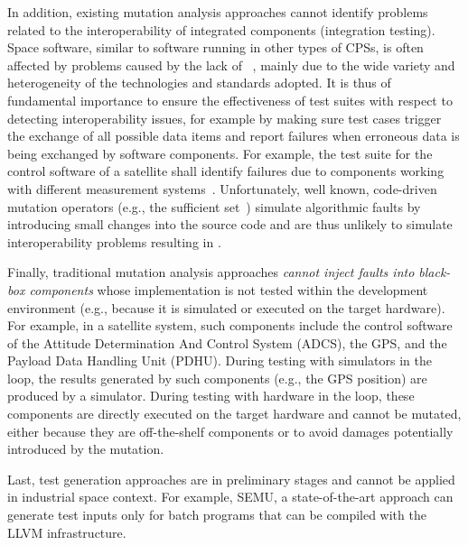 In addition, existing mutation analysis approaches cannot identify problems related to the interoperability of integrated components (integration testing).
Space software, similar to software running in other types of CPSs, is often affected by problems caused by the lack of  ~\cite{Givehchi:2017,Jirkovsk:2017}, mainly due to the wide variety and heterogeneity of the technologies and standards adopted.
It is thus of fundamental importance to ensure the effectiveness of test suites with respect to detecting interoperability issues, for example by making sure test cases trigger the exchange of all possible data items and report failures when erroneous data is being exchanged by software components. For example, the test suite for the control software of a satellite shall identify failures due to components working with different measurement systems~\cite{MarsClimateOrbiter}.
Unfortunately, well known, code-driven mutation operators (e.g., the sufficient set~\cite{delamaro2014designing,delamaro2014experimental}) simulate algorithmic faults by introducing small changes into the source code and are thus unlikely to simulate interoperability problems resulting in .

Finally, traditional mutation analysis approaches  \emph{cannot inject faults into black-box components} whose implementation is not tested within the development environment (e.g., because it is simulated or executed on the target hardware).
For example, in a satellite system, such components include the control software of the Attitude Determination And Control System (ADCS), the GPS, and the Payload Data Handling Unit (PDHU). During testing with simulators in the loop, the results generated by such components (e.g., the GPS position) are produced by a simulator. During testing with hardware in the loop, these components are directly executed on the target hardware and cannot be mutated, either because they are off-the-shelf components
or to avoid damages potentially introduced by the mutation.

Last, test generation approaches are in preliminary stages and cannot be applied in industrial space context. For example, SEMU, a state-of-the-art approach can generate test inputs only for batch programs that can be compiled with the LLVM infrastructure.

